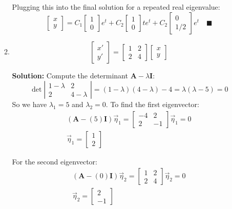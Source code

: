 \documentclass[letterpaper, fontsize=10pt]{scrartcl} %
\numberwithin{equation}{section} %
\numberwithin{figure}{section} %
\numberwithin{table}{section} %
\begin{document}
\begin{enumerate}
\begin{enumerate}[label=(\alph*)]
Plugging this into the final solution for a repeated real eigenvalue:
\[ \begin{bmatrix} x \\ y \end{bmatrix} = C_1 \begin{bmatrix} 1 \\ 0 \end{bmatrix} e^{t} + C_2 \begin{bmatrix} 1 \\ 0 \end{bmatrix} t e^{t} + C_2 \begin{bmatrix} 0 \\ 1/2 \end{bmatrix} e^{t} \quad\blacksquare \]

\item 

\[ \begin{bmatrix} x' \\ y'  \end{bmatrix} = \begin{bmatrix} 1 & 2 \\ 2 & 4 \end{bmatrix} \begin{bmatrix} x \\ y \end{bmatrix} \]
\par \textbf{Solution:} Compute the determinant $\bm{A} - \lambda \bm{I}$:
\[ \det\left|   \begin{matrix} 1 - \lambda & 2 \\ 2 & 4 - \lambda \end{matrix} \right| = (1 - \lambda)(4 - \lambda) - 4 = \lambda(\lambda - 5) = 0  \]
So we have $\lambda_1 = 5$ and $\lambda_2 = 0$. To find the first eigenvector:
\begin{gather*}
(\bm{A} - (5)\bm{I}) \vec{\eta}_1 = \begin{bmatrix} -4 & 2 \\ 2 & -1 \end{bmatrix} \vec{\eta}_1 = 0 \\
\vec{\eta}_1 = \begin{bmatrix} 1 \\ 2 \end{bmatrix} 
\end{gather*}

For the second eigenvector:
\begin{gather*}
(\bm{A} - (0)\bm{I}) \vec{\eta}_2 = \begin{bmatrix} 1 & 2 \\ 2 & 4 \end{bmatrix} \vec{\eta}_2 = 0 \\
\vec{\eta}_2 = \begin{bmatrix} 2 \\ -1 \end{bmatrix} 
\end{gather*}


\end{enumerate}
\end{enumerate}
\end{document}

